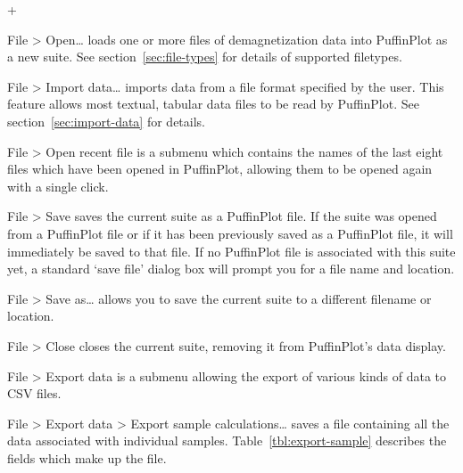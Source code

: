 \documentclass[a4paper,british]{article}
\newcommand{\menuitemlabel}[1]{%
\mbox{\textsf{#1}}\hfil}
\newenvironment{menuitemlist}%
{\begin{list}{}{%
\renewcommand{\makelabel}{\menuitemlabel}%
\setlength{\labelwidth}{35pt}%
\setlength{\leftmargin}%
             {\labelwidth+\labelsep}}}%
{\end{list}}
\newcommand{\caps}[1]{\MakeTextUppercase{#1}} %
\newcommand{\submenu}{ \textgreater{} } %
\begin{document}
\begin{menuitemlist}

\item[File\submenu Open\ldots] loads one or more files of demagnetization
  data into PuffinPlot as a new suite. See
  section~\ref{sec:file-types} for details of supported filetypes.

\item[File\submenu Import data\ldots] imports data from a file format
  specified by the user. This feature allows most textual, tabular data files
  to be read by PuffinPlot. See section~\ref{sec:import-data} for details.

\item[File\submenu Open recent file] is a submenu which contains the names of
  the last eight files which have been opened in PuffinPlot, allowing them to
  be opened again with a single click.

\item[File\submenu Save] saves the current suite as a PuffinPlot file. If
the suite was opened from a PuffinPlot file or if it has been previously
saved as a PuffinPlot file, it will immediately be saved to that file. If no %
PuffinPlot file is associated with this suite yet, a standard ‘save file’
dialog box will prompt you for a file name and location.

\item[File\submenu Save as\ldots] allows you to save the current suite to a
different filename or location.

\item[File\submenu Close] closes the current suite, removing it from
PuffinPlot's data display.

\item[File\submenu Export data] is a submenu allowing the export of
various kinds of data to \caps{csv} files.

\item[File\submenu Export data\submenu Export sample calculations\ldots]
  saves a file containing all the data associated with individual samples.
  Table~\ref{tbl:export-sample} describes the fields which make up the file.


\end{menuitemlist}
\end{document}
